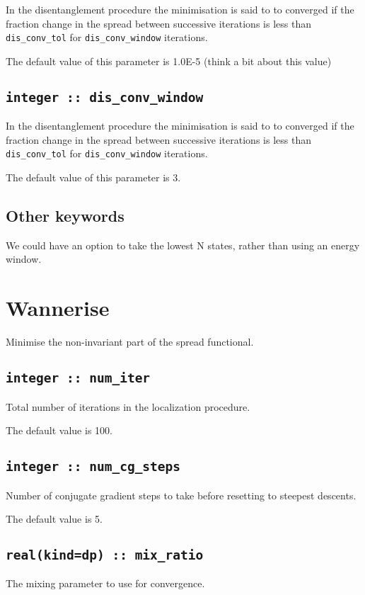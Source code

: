 In the disentanglement procedure the minimisation is said to to converged
if the fraction change in the spread between successive
iterations is less than
\verb#dis_conv_tol# for \verb#dis_conv_window# iterations.

The default value of this parameter is 1.0E-5 (think a bit about this value)


\subsection[dis\_conv\_window]{\tt integer :: dis\_conv\_window}

In the disentanglement procedure the minimisation is said to to converged
if the fraction change in the spread between successive
iterations is less than
\verb#dis_conv_tol# for \verb#dis_conv_window# iterations.

The default value of this parameter is 3.


\subsection{Other keywords}
 We could have an option to take the lowest N states, rather than using
 an energy window.



\section{Wannerise}
Minimise the non-invariant part of the spread functional.

\subsection[num\_iter]{\tt integer :: num\_iter}

Total number of iterations in the localization procedure.

The default value is 100.

\subsection[num\_cg\_steps]{\tt integer :: num\_cg\_steps}

Number of conjugate gradient steps to take before resetting to steepest descents.

The default value is 5.



\subsection[mix\_ratio]{\tt real(kind=dp) :: mix\_ratio}
The mixing parameter to use for convergence.

